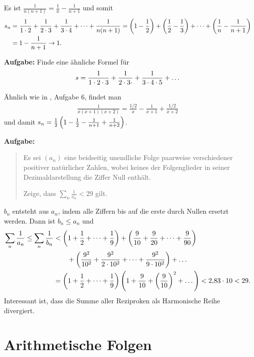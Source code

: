 \documentclass[11pt,a4paper]{article}
\begin{document}
\begin{loesung}
  Es ist $\frac{1}{n(n+1)}=\frac{1}{n}-\frac{1}{n+1}$ und somit
  \begin{align*}
    s_n&=\frac{1}{1\cdot 2}+\frac{1}{2\cdot 3}+\frac{1}{3\cdot 4}+\dots+\frac{1}{n(n+1)}
    =
    \left(1-\frac12\right)+\left(\frac12-\frac13\right)+\dots+\left(\frac{1}{n}-\frac{1}{n+1}\right)\\ 
    &= 1-\frac{1}{n+1} \to 1.
  \end{align*}
\end{loesung}

\textbf{Aufgabe:} Finde eine ähnliche Formel für
\begin{gather*}
  s=\frac{1}{1\cdot 2\cdot 3}+\frac{1}{2\cdot 3\cdot }+\frac{1}{3\cdot 4\cdot 5}+\dots
\end{gather*}
\begin{loesung}
  Ähnlich wie in \cite{S}, Aufgabe 6, findet man
  \begin{gather*}
    \frac{1}{x(x+1)(x+2)}=\frac{1/2}{x}-\frac{1}{x+1}+\frac{1/2}{x+2}
  \end{gather*}
  und damit $s_n=\frac12\left(1-\frac12-\frac{1}{n+1}+\frac{1}{n+2}\right)$. 
\end{loesung}

\textbf{Aufgabe:} 
\begin{quote}
  Es sei $(a_n)$ eine beidseitig unendliche Folge paarweise verschiedener
  positiver natürlicher Zahlen, wobei keines der Folgenglieder in seiner
  Dezimaldarstellung die Ziffer Null enthält.

  Zeige, dass $\sum_n{\frac{1}{a_n}}<29$ gilt. 
\end{quote}
\begin{loesung}
  $b_n$ entsteht aus $a_n$, indem alle Ziffern bis auf die erste durch Nullen
  ersetzt werden.  Dann ist $b_n\le a_n$ und
  \begin{align*}
    \sum_n{\frac{1}{a_n}}\le\sum_n{\frac{1}{b_n}}&<\left(1+\frac12+\dots+\frac19\right)
    +\left(\frac{9}{10}+\frac{9}{20}+\dots+\frac{9}{90}\right)\\&\qquad
    +\left(\frac{9^2}{10^2}+\frac{9^2}{2\cdot 10^2}+\dots+\frac{9^2}{9\cdot 10^2}\right)+
    \dots\\ &=
    \left(1+\frac12+\dots+\frac19\right)\left(1+\frac{9}{10}+\left(\frac{9}{10}\right)^2+\dots\right)
    <2{,}83\cdot 10 <29.
  \end{align*}
  Interessant ist, dass die Summe aller Reziproken als Harmonische Reihe
  divergiert.   
\end{loesung}

\section*{Arithmetische Folgen}
\end{document}
